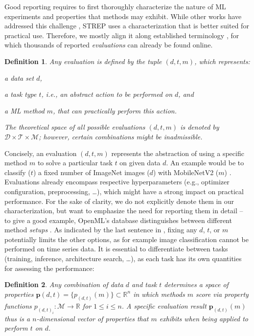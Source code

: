\documentclass[sn-mathphys,Numbered]{sn-jnl}%
\theoremstyle{thmstylethree}%
\newtheorem{definition}{Definition}%
\begin{document}
Good reporting requires to first thoroughly characterize the nature of ML experiments and properties that methods may exhibit.
While other works have addressed this challenge \cite{Assessing_Energy_Efficiency_of_ML,yeswecare}, STREP uses a characterization that is better suited for practical use.
Therefore, we mostly align it along established terminology \cite{paperswithcode}, for which thousands of reported \emph{evaluations} can already be found online.

\begin{definition}\label{def:evaluation}
Any evaluation is defined by the tuple $(d, t, m)$, which represents:
\begin{enumerate*}[label=(\roman*)]
    \item a data set $d$,
    \item a task type $t$, i.e., an abstract action to be performed on $d$, and
    \item a ML method $m$, that can practically perform this action.
\end{enumerate*}
The theoretical space of all possible evaluations $(d, t, m)$ is denoted by $\mathcal{D}\times\mathcal{T}\times\mathcal{M}$; however, certain combinations might be inadmissible.
\end{definition}

Concisely, an evaluation $(d, t, m)$ represents the abstraction of using a specific method $m$ to solve a particular task $t$ on given data $d$.
An example would be to classify ($t$) a fixed number of ImageNet images ($d$) with MobileNetV2 ($m$) \cite{howard_mobilenets_2017}.
Evaluations already encompass respective hyperparameters (e.g., optimizer configuration, preprocessing, \dots), which might have a strong impact on practical performance.
For the sake of clarity, we do not explicitly denote them in our characterization, but want to emphasize the need for reporting them in detail -- to give a good example, OpenML's database distinguishes between different method \emph{setups} \cite{vanschoren2014openml}.
As indicated by the last sentence in , fixing any $d$, $t$, or $m$ potentially limits the other options, as for example image classification cannot be performed on time series data.
It is essential to differentiate between tasks (training, inference, architecture search, \dots), as each task has its own quantities for assessing the performance:

\begin{definition}\label{def:properties}
Any combination of data $d$ and task $t$ determines a space of properties $\bm{p}(d, t) = \{p_{(d, t)}(m)\} \subset \mathbb{R}^n$ in which methods $m$ score via property functions $p_{(d, t)_i}: \mathcal{M} \rightarrow \mathbb{R}$ for $1 \leq i \leq n$. A specific evaluation result $\bm{p}_{(d, t)}(m)$ thus is a $n$-dimensional vector of properties that $m$ exhibits when being applied to perform $t$ on $d$.
\end{definition}
\end{document}
